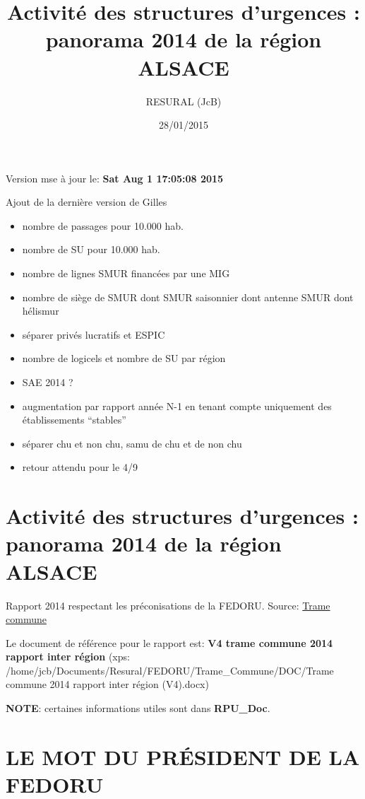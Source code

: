 \documentclass[]{article}
\title{Activité des structures d'urgences : panorama 2014 de la région ALSACE}
\author{RESURAL (JcB)}
\date{28/01/2015}
\begin{document}
\maketitle


{
\hypersetup{linkcolor=black}
\setcounter{tocdepth}{2}
\tableofcontents
}
Version mse à jour le: \textbf{Sat Aug 1 17:05:08 2015}

Ajout de la dernière version de Gilles

\begin{itemize}
\itemsep1pt\parskip0pt
\item
  nombre de passages pour 10.000 hab.
\item
  nombre de SU pour 10.000 hab.
\item
  nombre de lignes SMUR financées par une MIG
\item
  nombre de siège de SMUR dont SMUR saisonnier dont antenne SMUR dont
  hélismur
\item
  séparer privés lucratifs et ESPIC
\item
  nombre de logicels et nombre de SU par région
\item
  SAE 2014 ?
\item
  augmentation par rapport année N-1 en tenant compte uniquement des
  établissements ``stables''
\item
  séparer chu et non chu, samu de chu et de non chu
\item
  retour attendu pour le 4/9
\end{itemize}

\section{Activité des structures d'urgences : panorama 2014 de la région
ALSACE}\label{activite-des-structures-durgences-panorama-2014-de-la-region-alsace}

Rapport 2014 respectant les préconisations de la FEDORU. Source:
\href{https://docs.google.com/document/d/101LYVqVLeHZnrujfMm3aqBYfbOwx3CPEB3Y-Lbud2Ls/edit}{Trame
commune}

Le document de référence pour le rapport est: \textbf{V4 trame commune
2014 rapport inter région} (xps:
/home/jcb/Documents/Resural/FEDORU/Trame\_Commune/DOC/Trame commune 2014
rapport inter région (V4).docx)

\textbf{NOTE}: certaines informations utiles sont dans
\textbf{RPU\_Doc}.

\section{LE MOT DU PRÉSIDENT DE LA
FEDORU}\label{le-mot-du-president-de-la-fedoru}
\end{document}
